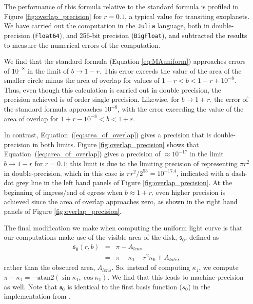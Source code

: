 \documentclass[modern]{aastex61}
\begin{document}
The performance of this formula relative to the standard formula is profiled
in Figure \ref{fig:overlap_precision} for $r=0.1$, a typical
value for transiting exoplanets.  We have carried out
the computation in the \texttt{Julia} language, both in double-precision
(\texttt{Float64}), and 256-bit precision (\texttt{BigFloat}), and
subtracted the results to measure the numerical errors of the computation.

We find that the standard
formula (Equation \ref{eq:MAuniform}) approaches errors of $10^{-8}$
in the limit of $b \rightarrow 1-r$. This error exceeds the value
of the area of the smaller circle minus the area of overlap for
values of $1-r < b < 1-r+10^{-8}$.  Thus, even though this calculation
is carried out in double precision, the precision achieved is of
order single precision.  Likewise, for $b \rightarrow 1+r$,
the error of the standard formula approaches $10^{-8}$, with the
error exceeding the value of the area of overlap for $1+r-10^{-8} <
b < 1+r$.

In contrast, Equation~(\ref{eq:area_of_overlap}) gives a precision
that is double-precision in both limits.  Figure
\ref{fig:overlap_precision} shows that Equation~(\ref{eq:area_of_overlap})
gives a precision of $\approx 10^{-17}$ in the limit $b \rightarrow
1-r$ for $r=0.1$; this limit is due to the limiting precision of
representing $\pi r^2$ in double-precision, which in this case
is $\pi r^2 / 2^{53} = 10^{-17.4}$, indicated with a dash-dot
grey line in the left hand panels of Figure \ref{fig:overlap_precision}.
At the beginning of ingress/end of egress when $b \approx 1+r$,
even higher precision is achieved since the area of overlap approaches
zero, as shown in the right hand panels of Figure \ref{fig:overlap_precision}.

The final modification we make when computing the uniform light
curve is that our computations make use of the visible area of the disk, $\mathfrak{s}_0$, defined as
\begin{eqnarray} \label{eq:uniform}
\mathfrak{s}_0(r,b) &=& \pi-A_{lens}\nonumber\\
&=&\pi -\kappa_1 - r^2\kappa_0 + A_{kite},
\end{eqnarray}
rather than the obscured area, $A_{lens}$.  So, instead of computing $\kappa_1$,
we compute $\pi-\kappa_1 = -\mathrm{atan2}(\sin{\kappa_1},\cos{\kappa_1})$.
We find that this leads to machine-precision as well.  Note that $\mathfrak{s}_0$ is
identical to the first basis function ($s_0$) in the \starry implementation 
from \citet{starry}.
\end{document}
